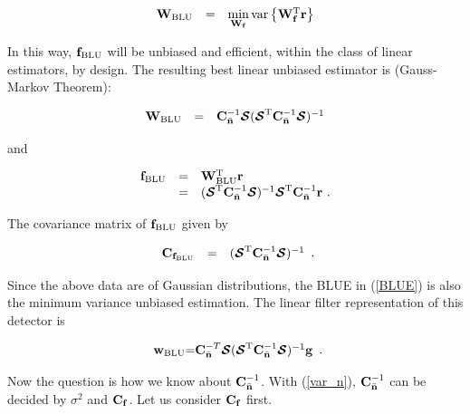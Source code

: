 \documentclass[a4paper,11pt,fleqn]{article}
\newcommand{\br}{{\mathbf r}}
\newcommand{\bC}{{\bf C}}
\newcommand{\bg}{{\bf g}}
\newcommand{\bn}{{\bf n}}
\newcommand{\bw}{{\bf w}}
\newcommand{\bbf}{{\bf f}}
\newcommand{\bW}{{\bf W}}
\newcommand{\bcS}{{\mbox {\boldmath ${\cal S}$}}}
\begin{document}
\begin{equation}
\begin{array}{rcl}
\bW_{\rm BLU}&=&\min\limits_{\bW_{\bbf}}
\mbox{var}\left\{\bW_{\bbf}^{\rm T}\br\right\}
\end{array}
\end{equation}

In this way, ${\bbf}_{\rm BLU}$ will be unbiased and efficient,
within the class of linear estimators, by design. The resulting
best linear unbiased estimator is (Gauss-Markov Theorem):

\begin{equation}
\begin{array}{rcl}
{\bW}_{\rm BLU}&=&\bC_{\bar{\bn}}^{-1}\bcS(\bcS^{\rm
T}\bC_{\bar{\bn}}^{-1}\bcS)^{-1}
\end{array}
\end{equation}

\noindent and

\begin{equation}
\begin{array}{rcl}
{\bbf}_{\rm BLU}&=&\bW_{\rm BLU}^{\rm T}\br\\
 &=&(\bcS^{\rm
T}\bC_{\bar{\bn}}^{-1}\bcS)^{-1}\bcS^{\rm
T}\bC_{\bar{\bn}}^{-1}\br\ .
\end{array} \label{BLUE}
\end{equation}

\noindent The covariance matrix of ${\bbf}_{\rm BLU}$ given by

\begin{equation}
\begin{array}{rcl}
{\bC}_{\bbf_{\rm BLU}}&=&(\bcS^{\rm
T}\bC_{\bar{\bn}}^{-1}\bcS)^{-1}
\end{array}.
\end{equation}

\noindent Since the above data are of Gaussian distributions, the
BLUE in (\ref{BLUE}) is also the minimum variance unbiased
estimation. The linear filter representation of this detector is

\begin{equation}
\begin{array}{rcl}
{\bw}_{\rm BLU}$=$\bC_{\bar{\bn}}^{-T}\bcS(\bcS^{\rm
T}\bC_{\bar{\bn}}^{-1}\bcS)^{-1}\bg
\end{array}.\label{w_BLUE}
\end{equation}

Now the question is how we know about $\bC_{\bar{\bn}}^{-1}$. With
(\ref{var_n}), $\bC_{\bar{\bn}}^{-1}$ can be decided by $\sigma^2$
and $\bC_{\bbf}$. Let us consider $\bC_{\bbf}$ first.
\end{document}
